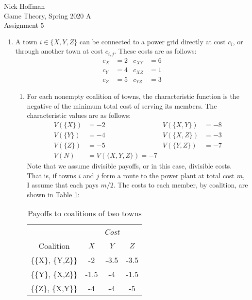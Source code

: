 \documentclass[11pt]{article}
\begin{document}
\begin{flushleft}
	Nick Hoffman \\
	Game Theory, Spring 2020 A \\
	Assignment 5 \\
\end{flushleft}

\begin{enumerate}
	\item A town \( i\in\{X, Y, Z\} \) can be connected to a power grid directly at cost \( c_i \), or through another town at cost \( c_{i,j} \). These costs are as follows:
	\begin{align*}
		c_X &= 2 & c_{XY} &= 6 \\
		c_Y &= 4 & c_{XZ} &= 1 \\
		c_Z &= 5 & c_{YZ} &= 3 
	\end{align*}
	\begin{enumerate}
		\item For each nonempty coalition of towns, the characteristic function is the negative of the minimum total cost of serving its members. The characteristic values are as follows: 
		\begin{align*}
			V(\{X\}) &= -2 & V(\{X,Y\}) &= -8 \\
			V(\{Y\}) &= -4 & V(\{X,Z\}) &= -3 \\
			V(\{Z\}) &= -5 & V(\{Y,Z\}) &= -7 \\
			V(N) &= V(\{X, Y, Z\}) = -7 
		\end{align*}
		Note that we assume divisible payoffs, or in this case, divisible costs. That is, if towns \( i \) and \( j \) form a route to the power plant at total cost \( m \), I assume that each pays \( m/2 \). The costs to each member, by coalition, are shown in Table \ref{coalitions}:
		
		\begin{table}[!h]
			\centering
			\caption{Payoffs to coalitions of two towns}
			\begin{tabular}{ c | c c c} 
				 & \multicolumn{3}{c}{\emph{Cost}} \\
			Coalition & \( X \) & \( Y \) & \( Z \) \\ \hline
			\{\{X\}, \{Y,Z\}\} & -2 & -3.5 & -3.5 \\
			\{\{Y\}, \{X,Z\}\} & -1.5 & -4 & -1.5 \\
			\{\{Z\}, \{X,Y\}\} & -4 & -4 & -5 \\
			\end{tabular}
			\label{coalitions}
		\end{table}
		

\end{enumerate}
\end{enumerate}
\end{document}
